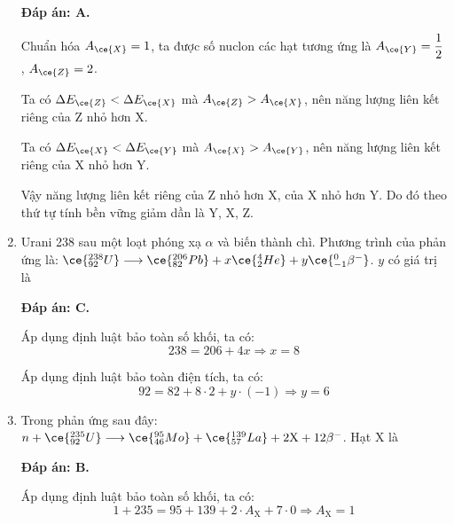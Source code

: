 \begin{enumerate}[label=\bfseries Câu \arabic*:]
	\loigiai
	{		\textbf{Đáp án: A.}
		
		Chuẩn hóa $A_{\ce{X}} = 1$, ta được số nuclon các hạt tương ứng là $A_{\ce{Y}} = \dfrac{1}{2}$, $A_{\ce{Z}} = 2$.
		
		Ta có $\Delta E_{\ce{Z}} < \Delta E_{\ce{X}}$ mà $A_{\ce{Z}} > A_{\ce{X}}$, nên năng lượng liên kết riêng của Z nhỏ hơn X.
		
		
		Ta có $\Delta E_{\ce{X}} < \Delta E_{\ce{Y}}$ mà $A_{\ce{X}} > A_{\ce{Y}}$, nên năng lượng liên kết riêng của X nhỏ hơn Y.
		
		Vậy năng lượng liên kết riêng của Z nhỏ hơn X, của X nhỏ hơn Y. Do đó theo thứ tự tính bền vững giảm dần là Y, X, Z.
	}
	
	
	
	
	
	\item {}
	\cauhoi
	{Urani 238 sau một loạt phóng xạ $\alpha$ và biến thành chì. Phương trình của phản ứng là: $\ce{^{238}_{92} U} \longrightarrow \ce{^{206} _{82} Pb} + x \ce{^4_2 He} + y \ce{^0_{-1} \beta^{-}}$. $y$ có giá trị là
	}
	
	\loigiai
	{		\textbf{Đáp án: C.}
		
		Áp dụng định luật bảo toàn số khối, ta có:
		$$238 = 206 + 4x \Rightarrow x = 8$$
		
		Áp dụng định luật bảo toàn điện tích, ta có:
		$$92 = 82 + 8 \cdot 2 + y \cdot (-1) \Rightarrow y = 6$$
		
	}
	
	\item {}
	\cauhoi
	{Trong phản ứng sau đây: $n+ \ce{^{235}_{92} U} \longrightarrow \ce{^{95}_{46} Mo} + \ce{^{139}_{57} La} + 2\text{X} + 12\beta^{-}$. Hạt X là
	}
	
	\loigiai
	{		\textbf{Đáp án: B.}
		
		Áp dụng định luật bảo toàn số khối, ta có:
		$$1+235=95+139+2\cdot A_{\text{X}} + 7 \cdot 0 \Rightarrow A_{\text{X}} = 1$$
		
}
\end{enumerate}
